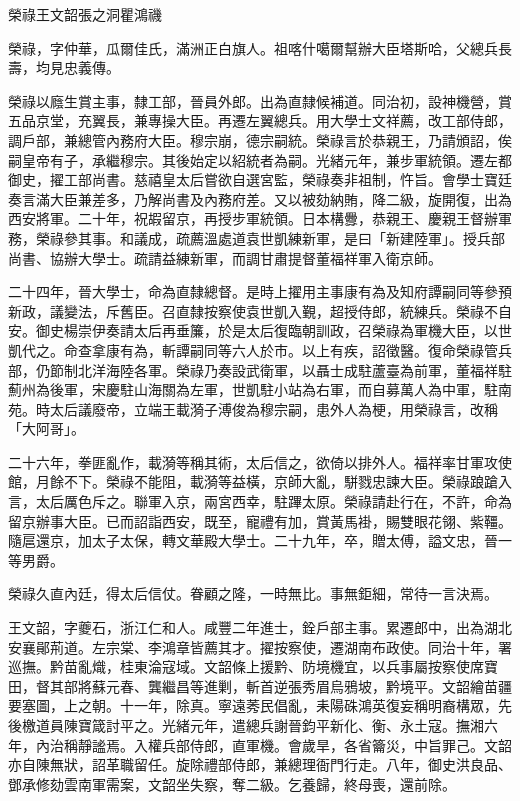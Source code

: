 
\begin{pinyinscope}
榮祿王文韶張之洞瞿鴻禨

榮祿，字仲華，瓜爾佳氏，滿洲正白旗人。祖喀什噶爾幫辦大臣塔斯哈，父總兵長壽，均見忠義傳。

榮祿以廕生賞主事，隸工部，晉員外郎。出為直隸候補道。同治初，設神機營，賞五品京堂，充翼長，兼專操大臣。再遷左翼總兵。用大學士文祥薦，改工部侍郎，調戶部，兼總管內務府大臣。穆宗崩，德宗嗣統。榮祿言於恭親王，乃請頒詔，俟嗣皇帝有子，承繼穆宗。其後始定以紹統者為嗣。光緒元年，兼步軍統領。遷左都御史，擢工部尚書。慈禧皇太后嘗欲自選宮監，榮祿奏非祖制，忤旨。會學士寶廷奏言滿大臣兼差多，乃解尚書及內務府差。又以被劾納賄，降二級，旋開復，出為西安將軍。二十年，祝嘏留京，再授步軍統領。日本構釁，恭親王、慶親王督辦軍務，榮祿參其事。和議成，疏薦溫處道袁世凱練新軍，是曰「新建陸軍」。授兵部尚書、協辦大學士。疏請益練新軍，而調甘肅提督董福祥軍入衛京師。

二十四年，晉大學士，命為直隸總督。是時上擢用主事康有為及知府譚嗣同等參預新政，議變法，斥舊臣。召直隸按察使袁世凱入覲，超授侍郎，統練兵。榮祿不自安。御史楊崇伊奏請太后再垂簾，於是太后復臨朝訓政，召榮祿為軍機大臣，以世凱代之。命查拿康有為，斬譚嗣同等六人於市。以上有疾，詔徵醫。復命榮祿管兵部，仍節制北洋海陸各軍。榮祿乃奏設武衛軍，以聶士成駐蘆臺為前軍，董福祥駐薊州為後軍，宋慶駐山海關為左軍，世凱駐小站為右軍，而自募萬人為中軍，駐南苑。時太后議廢帝，立端王載漪子溥俊為穆宗嗣，患外人為梗，用榮祿言，改稱「大阿哥」。

二十六年，拳匪亂作，載漪等稱其術，太后信之，欲倚以排外人。福祥率甘軍攻使館，月餘不下。榮祿不能阻，載漪等益橫，京師大亂，駢戮忠諫大臣。榮祿踉蹌入言，太后厲色斥之。聯軍入京，兩宮西幸，駐蹕太原。榮祿請赴行在，不許，命為留京辦事大臣。已而詔詣西安，既至，寵禮有加，賞黃馬褂，賜雙眼花翎、紫韁。隨扈還京，加太子太保，轉文華殿大學士。二十九年，卒，贈太傅，謚文忠，晉一等男爵。

榮祿久直內廷，得太后信仗。眷顧之隆，一時無比。事無鉅細，常待一言決焉。

王文韶，字夔石，浙江仁和人。咸豐二年進士，銓戶部主事。累遷郎中，出為湖北安襄鄖荊道。左宗棠、李鴻章皆薦其才。擢按察使，遷湖南布政使。同治十年，署巡撫。黔苗亂熾，桂東淪寇域。文韶條上援黔、防境機宜，以兵事屬按察使席寶田，督其部將蘇元春、龔繼昌等進剿，斬首逆張秀眉烏鴉坡，黔境平。文韶繪苗疆要塞圖，上之朝。十一年，除真。寧遠莠民倡亂，耒陽硃鴻英復妄稱明裔構眾，先後檄道員陳寶箴討平之。光緒元年，遣總兵謝晉鈞平新化、衡、永土寇。撫湘六年，內治稱靜謐焉。入權兵部侍郎，直軍機。會歲旱，各省籥災，中旨罪己。文韶亦自陳無狀，詔革職留任。旋除禮部侍郎，兼總理衙門行走。八年，御史洪良品、鄧承修劾雲南軍需案，文韶坐失察，奪二級。乞養歸，終母喪，還前除。


\end{pinyinscope}
